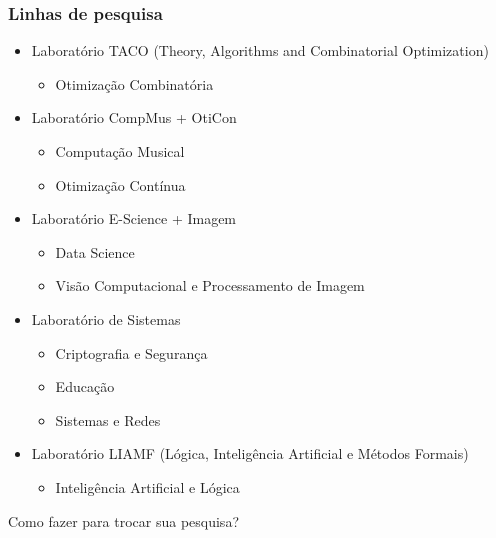 \documentclass{beamer}
\begin{document}
\begin{frame}
  \frametitle{Linhas de pesquisa}

  \footnotesize
  \begin{itemize}
    \item Laboratório TACO (Theory, Algorithms and Combinatorial Optimization)
      \begin{itemize}\scriptsize
        \item Otimização Combinatória
      \end{itemize}\pause
    \item Laboratório CompMus + OtiCon
      \begin{itemize}\scriptsize
        \item Computação Musical
        \item Otimização Contínua
      \end{itemize}\pause
    \item Laboratório E-Science + Imagem
      \begin{itemize}\scriptsize
        \item Data Science
        \item Visão Computacional e Processamento de Imagem
      \end{itemize}\pause
    \item Laboratório de Sistemas
      \begin{itemize}\scriptsize
        \item Criptografia e Segurança
        \item Educação
        \item Sistemas e Redes
      \end{itemize}\pause
    \item Laboratório LIAMF (Lógica, Inteligência Artificial e Métodos Formais)
      \begin{itemize}\scriptsize
        \item Inteligência Artificial e Lógica
      \end{itemize}
  \end{itemize}

  \small Como fazer para trocar sua pesquisa?
\end{frame}
\end{document}

